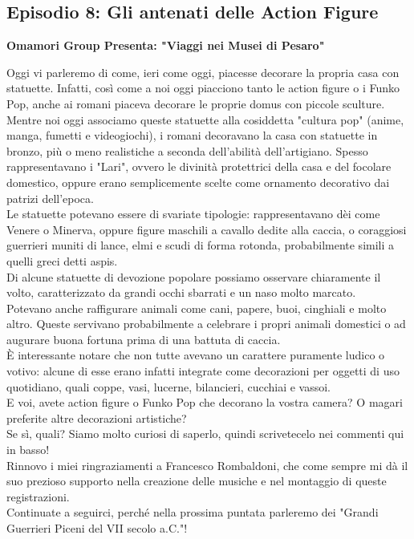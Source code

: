 \documentclass[hidelinks,12pt,a4paper]{article}
\begin{document}
\begin{flushleft}
		\subsection{Episodio 8: Gli antenati delle Action Figure}
		\begin{center}
			\textbf{Omamori Group Presenta: "Viaggi nei Musei di Pesaro"}
		\end{center}
		Oggi vi parleremo di come, ieri come oggi, piacesse decorare la propria casa con statuette. Infatti, così come a noi oggi piacciono tanto le action figure o i Funko Pop, anche ai romani piaceva decorare le proprie domus con piccole sculture.\\
		Mentre noi oggi associamo queste statuette alla cosiddetta "cultura pop" (anime, manga, fumetti e videogiochi), i romani decoravano la casa con statuette in bronzo, più o meno realistiche a seconda dell'abilità dell'artigiano. Spesso rappresentavano i "Lari", ovvero le divinità protettrici della casa e del focolare domestico, oppure erano semplicemente scelte come ornamento decorativo dai patrizi dell'epoca.\\
		Le statuette potevano essere di svariate tipologie: rappresentavano dèi come Venere o Minerva, oppure figure maschili a cavallo dedite alla caccia, o coraggiosi guerrieri muniti di lance, elmi e scudi di forma rotonda, probabilmente simili a quelli greci detti aspis.\\
		Di alcune statuette di devozione popolare possiamo osservare chiaramente il volto, caratterizzato da grandi occhi sbarrati e un naso molto marcato.\\
		Potevano anche raffigurare animali come cani, papere, buoi, cinghiali e molto altro. Queste servivano probabilmente a celebrare i propri animali domestici o ad augurare buona fortuna prima di una battuta di caccia.\\
		È interessante notare che non tutte avevano un carattere puramente ludico o votivo: alcune di esse erano infatti integrate come decorazioni per oggetti di uso quotidiano, quali coppe, vasi, lucerne, bilancieri, cucchiai e vassoi.\\
		E voi, avete action figure o Funko Pop che decorano la vostra camera? O magari preferite altre decorazioni artistiche?\\
		Se sì, quali? Siamo molto curiosi di saperlo, quindi scrivetecelo nei commenti qui in basso!\\
		Rinnovo i miei ringraziamenti a Francesco Rombaldoni, che come sempre mi dà il suo prezioso supporto nella creazione delle musiche e nel montaggio di queste registrazioni.\\
		Continuate a seguirci, perché nella prossima puntata parleremo dei "Grandi Guerrieri Piceni del VII secolo a.C."!\\
		

\end{flushleft}
\end{document}

